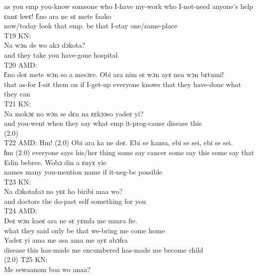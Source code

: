 \documentclass[output=paper,colorlinks,citecolor=brown]{langscibook}
\begin{document}
            as you emp you-know someone who I-have my-work who I-not-need anyone’s help\\
    \ex
    \gll    ɛnnɛ hwɛ! Ɛno ara ne sɛ mete faako \\
            now/today look that emp. be that I-stay one/same-place\\
    \z
\ex%
    T19 KN:\\
    \gll    Na wɔn de wo akɔ dɔkota?\\
            and they take you have-gone hospital\\
\ex%
    T20 AMD:\\
    \gll    Ɛno deɛ mete wɔn so a mesɔre. Obi ara nim sɛ wɔn ayɛ nea wɔn bɛtumi!\\
            that as-for I-sit them on if I-get-up everyone knows that they have-done what they can\\
\ex%
    T21 KN:\\
    \gll    Na mokɔɛ no wɔn se dɛn na ɛɛkɔɔso yadeɛ yi?\\
            and you-went when they say what emp it-prog-cause disease this\\
            (2.0) \\
\ex%
    T22 AMD:
    \ea
    \gll    Hm! (2.0) Obi ara ka ne deɛ. Ebi se kansa, ebi se sei, ebi se sei. \\
            ɦm (2.0) everyone says his/her thing some say cancer some say this some say that \\
    \ex
    \gll    Edin bebree. Wobɔ din a ɛnyɛ yie \\
            names many you-mention name if it-neg-be possible \\
    \z
\ex%
    T23 KN:\\
    \gll    Na dɔkotafoɔ no yɛɛ ho biribi maa wo?\\
            and doctors the do-past self something for you\\
\ex%
    T24 AMD:\\
    \ea
    \gll    Deɛ wɔn kaeɛ ara ne sɛ yɛmfa me mmra fie. \\
            what they said only be that we-bring me come home\\
    \ex     
    \gll    Yadeɛ yi ama me asa ama me ayɛ abɔfra \\
            disease this has-made me encumbered has-made me become child\\
            (2.0)
    \z
\ex%
    T25 KN:\\
    \gll    Me sewaanom boa wo anaa? \\
\end{document}
